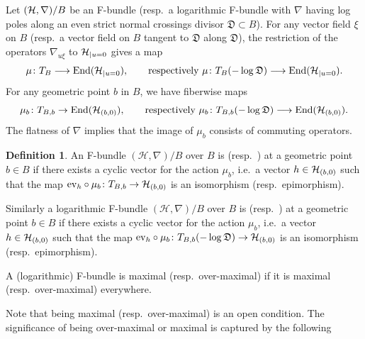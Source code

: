 \documentclass[twoside,leqno]{article}
\numberwithin{equation}{section}
\theoremstyle{plain}
\theoremstyle{definition}
\newtheorem{definition}[equation]{Definition}
\begin{document}
Let $(\mathcal H,\nabla)/B$ be an F-bundle (resp.\ a logarithmic F-bundle with $\nabla$ having log poles along an even strict normal crossings divisor $\mathfrak{D} \subset B$).
For any vector field $\xi$ on $B$ (resp.\ a vector field on $B$ tangent to $\mathfrak{D}$ along $\mathfrak{D}$), the restriction of the operators $\nabla_{u\xi}$ to $\mathcal H_{|u=0}$ gives a  map
\[ 
\mu \colon T_{B} \longrightarrow \operatorname{End}(\mathcal H_{|u=0}),
\qquad \text{respectively} \ \mu \colon T_{B}(-\log \mathfrak{D}) \longrightarrow \operatorname{End}(\mathcal H_{|u=0}). 
\]
For any geometric point $b$ in $B$, we have fiberwise maps
\[
\mu_b \colon T_{B,b} \to \operatorname{End}(\mathcal H_{(b,0)}), 
\qquad \text{respectively} \ \mu_{b} \colon T_{B,b}(-\log \mathfrak{D}) \longrightarrow \operatorname{End}(\mathcal H_{(b,0)}). 
\]
The flatness of $\nabla$ implies that the image of $\mu_b$ consists of commuting operators. 

\begin{definition} \label{def:overmaximal}
An F-bundle $(\mathcal H,\nabla)/B$ over $B$ is  (resp.\ ) at a geometric point $b\in B$ if there exists a cyclic vector for the action $\mu_{b}$, i.e.\ a vector $h \in \mathcal H_{(b,0)}$ such that the map $\mathrm{ev}_h \circ \mu_b\colon T_{B,b} \to \mathcal H_{(b,0)}$ is an isomorphism (resp.\ epimorphism). 

Similarly a logarithmic F-bundle $(\mathcal H,\nabla)/B$ over $B$ is  (resp.\ ) at a geometric point $b\in B$ if there exists a cyclic vector for the action $\mu_{b}$, i.e.\ a vector $h \in \mathcal H_{(b,0)}$ such that the map $\mathrm{ev}_h \circ \mu_b\colon T_{B,b}(-\log \mathfrak{D})  \to \mathcal H_{(b,0)}$ is an isomorphism (resp.\ epimorphism).
  
A (logarithmic)  F-bundle is maximal (resp.\ over-maximal) if it is maximal (resp.\ over-maximal) everywhere.
\end{definition}

Note that being maximal (resp.\ over-maximal) is an open condition. The significance of being over-maximal or maximal is captured by the following
\end{document}
